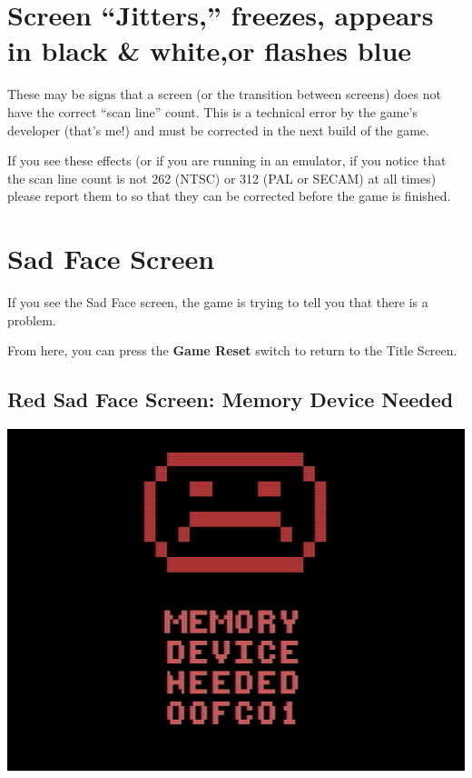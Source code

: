 \documentclass[10pt,twocolumn,openany,article]{memoir}
\begin{document}
\ifdefined\DEMO

\section*{Screen ``Jitters,'' freezes,  \ifdefined\TVPAL appears in black
  \& white,\fi or flashes blue}

These may  be signs that  a screen  (or the transition  between screens)
does not have the correct ``scan line'' count. This is a technical error
by the game's  developer (that's me!) and must be  corrected in the next
build of the game.

If you see these  effects (or if you are running in  an emulator, if you
notice that the scan line count is  not 262 (NTSC) or 312 (PAL or SECAM)
at       all       times)        please       report       them       to
 so  that they
can be corrected before the game is finished.

\fi

\section*{Sad Face Screen}

If you  see the Sad  Face screen,  the game is  trying to tell  you that
there is a problem.

From here, you can press the \textbf{Game Reset} switch to return to the
Title Screen.

\ifdefined\ATARIAGESAVE\else\ifdefined\NOSAVE\else

\subsection{Red Sad Face Screen: Memory Device Needed}

\includegraphics[width=\columnwidth]{../Manual/RedSadFaceNTSC.png}
\end{document}
